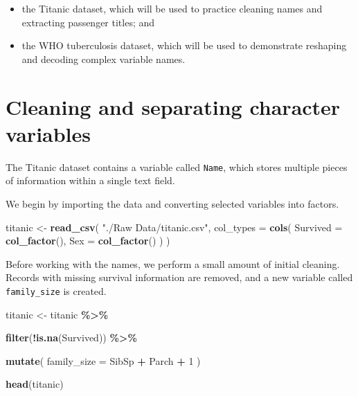 \documentclass[
  11pt,
  oneside]{book}
\newenvironment{Shaded}{\begin{snugshade}}{\end{snugshade}}
\newcommand{\AttributeTok}[1]{\textcolor[rgb]{0.13,0.29,0.53}{#1}}
\newcommand{\DecValTok}[1]{\textcolor[rgb]{0.00,0.00,0.81}{#1}}
\newcommand{\FunctionTok}[1]{\textcolor[rgb]{0.13,0.29,0.53}{\textbf{#1}}}
\newcommand{\NormalTok}[1]{#1}
\newcommand{\OtherTok}[1]{\textcolor[rgb]{0.56,0.35,0.01}{#1}}
\newcommand{\SpecialCharTok}[1]{\textcolor[rgb]{0.81,0.36,0.00}{\textbf{#1}}}
\newcommand{\StringTok}[1]{\textcolor[rgb]{0.31,0.60,0.02}{#1}}
\providecommand{\tightlist}{%
  \setlength{\itemsep}{0pt}\setlength{\parskip}{0pt}}
\begin{document}
\begin{itemize}
\tightlist
\item
  the Titanic dataset, which will be used to practice cleaning names and extracting passenger titles; and
\item
  the WHO tuberculosis dataset, which will be used to demonstrate reshaping and decoding complex variable names.
\end{itemize}

\section{Cleaning and separating character variables}\label{cleaning-and-separating-character-variables}

The Titanic dataset contains a variable called \texttt{Name}, which stores multiple pieces of information within a single text field.

We begin by importing the data and converting selected variables into factors.

\begin{Shaded}
\begin{Highlighting}[]
\NormalTok{titanic }\OtherTok{\textless{}{-}} \FunctionTok{read\_csv}\NormalTok{(}
  \StringTok{"./Raw Data/titanic.csv"}\NormalTok{,}
  \AttributeTok{col\_types =} \FunctionTok{cols}\NormalTok{(}
    \AttributeTok{Survived =} \FunctionTok{col\_factor}\NormalTok{(),}
    \AttributeTok{Sex =} \FunctionTok{col\_factor}\NormalTok{()}
\NormalTok{  )}
\NormalTok{)}
\end{Highlighting}
\end{Shaded}

Before working with the names, we perform a small amount of initial cleaning. Records with missing survival information are removed, and a new variable called \texttt{family\_size} is created.

\begin{Shaded}
\begin{Highlighting}[]
\NormalTok{titanic }\OtherTok{\textless{}{-}}\NormalTok{ titanic }\SpecialCharTok{\%\textgreater{}\%}
  
  \FunctionTok{filter}\NormalTok{(}\SpecialCharTok{!}\FunctionTok{is.na}\NormalTok{(Survived)) }\SpecialCharTok{\%\textgreater{}\%}
  
  \FunctionTok{mutate}\NormalTok{(}
    \AttributeTok{family\_size =}\NormalTok{ SibSp }\SpecialCharTok{+}\NormalTok{ Parch }\SpecialCharTok{+} \DecValTok{1}
\NormalTok{  )}

\FunctionTok{head}\NormalTok{(titanic)}
\end{Highlighting}
\end{Shaded}
\end{document}
